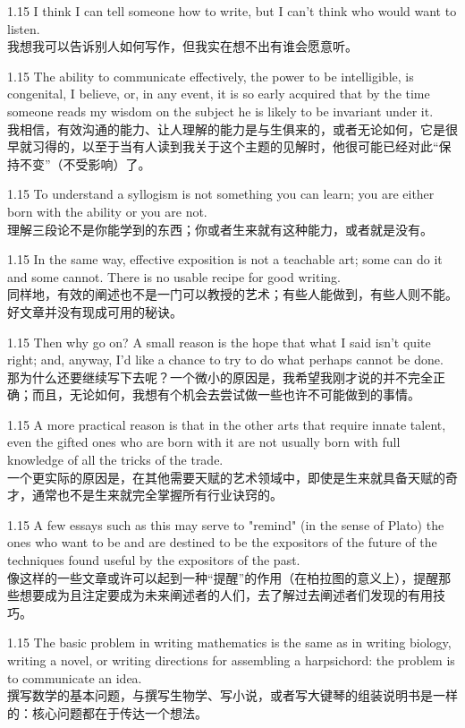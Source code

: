 \documentclass[12pt,a4paper]{article}
\newcommand{\bilingual}[2]{
    \begin{spacing}{1.15} %
        \noindent \normalsize #1 \\[-0.5ex] %
        \small \textcolor{blue!70!black}{#2} %
    \end{spacing}
    \vspace{0.8em} %
}
\begin{document}
\bilingual{I think I can tell someone how to write, but I can't think who would want to listen.}
{我想我可以告诉别人如何写作，但我实在想不出有谁会愿意听。} %

\bilingual{The ability to communicate effectively, the power to be intelligible, is congenital, I believe, or, in any event, it is so early acquired that by the time someone reads my wisdom on the subject he is likely to be invariant under it.}
{我相信，有效沟通的能力、让人理解的能力是与生俱来的，或者无论如何，它是很早就习得的，以至于当有人读到我关于这个主题的见解时，他很可能已经对此“保持不变”（不受影响）了。} %

\bilingual{To understand a syllogism is not something you can learn; you are either born with the ability or you are not.}
{理解三段论不是你能学到的东西；你或者生来就有这种能力，或者就是没有。} %

\bilingual{In the same way, effective exposition is not a teachable art; some can do it and some cannot. There is no usable recipe for good writing.}
{同样地，有效的阐述也不是一门可以教授的艺术；有些人能做到，有些人则不能。好文章并没有现成可用的秘诀。} %

\bilingual{Then why go on? A small reason is the hope that what I said isn't quite right; and, anyway, I'd like a chance to try to do what perhaps cannot be done.}
{那为什么还要继续写下去呢？一个微小的原因是，我希望我刚才说的并不完全正确；而且，无论如何，我想有个机会去尝试做一些也许不可能做到的事情。} %

\bilingual{A more practical reason is that in the other arts that require innate talent, even the gifted ones who are born with it are not usually born with full knowledge of all the tricks of the trade.}
{一个更实际的原因是，在其他需要天赋的艺术领域中，即使是生来就具备天赋的奇才，通常也不是生来就完全掌握所有行业诀窍的。} %

\bilingual{A few essays such as this may serve to "remind" (in the sense of Plato) the ones who want to be and are destined to be the expositors of the future of the techniques found useful by the expositors of the past.}
{像这样的一些文章或许可以起到一种“提醒”的作用（在柏拉图的意义上），提醒那些想要成为且注定要成为未来阐述者的人们，去了解过去阐述者们发现的有用技巧。} %

\bilingual{The basic problem in writing mathematics is the same as in writing biology, writing a novel, or writing directions for assembling a harpsichord: the problem is to communicate an idea.}
{撰写数学的基本问题，与撰写生物学、写小说，或者写大键琴的组装说明书是一样的：核心问题都在于传达一个想法。} %
\end{document}
